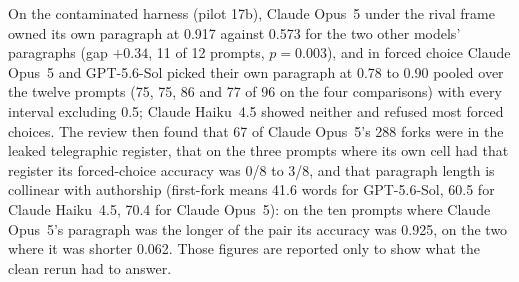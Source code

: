 \documentclass[twocolumn,10pt]{article}
\newcommand{\opus}{Claude Opus~5}
\newcommand{\haiku}{Claude Haiku~4.5}
\newcommand{\gpt}{GPT-5.6-Sol}
\begin{document}
On the contaminated harness (pilot 17b), \opus{} under the rival frame owned its own paragraph at 0.917 against 0.573 for the two other models' paragraphs (gap $+0.34$, 11 of 12 prompts, $p=0.003$), and in forced choice \opus{} and \gpt{} picked their own paragraph at 0.78 to 0.90 pooled over the twelve prompts (75, 75, 86 and 77 of 96 on the four comparisons) with every interval excluding 0.5; \haiku{} showed neither and refused most forced choices. The review then found that 67 of \opus{}'s 288 forks were in the leaked telegraphic register, that on the three prompts where its own cell had that register its forced-choice accuracy was 0/8 to 3/8, and that paragraph length is collinear with authorship (first-fork means 41.6 words for \gpt{}, 60.5 for \haiku{}, 70.4 for \opus{}): on the ten prompts where \opus{}'s paragraph was the longer of the pair its accuracy was 0.925, on the two where it was shorter 0.062. Those figures are reported only to show what the clean rerun had to answer.
\end{document}
